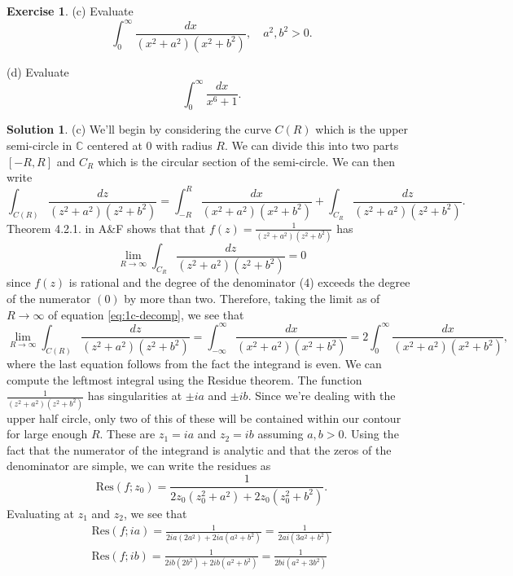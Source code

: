 \documentclass[12pt]{article}
\newcommand{\bbC}{\mathbb{C}}
\newcommand{\Res}{\text{Res}}
\theoremstyle{definition}
\newtheorem{exer}{Exercise}
\newtheorem{sol}{Solution}
\theoremstyle{remark}
\begin{document}
\begin{exer}
    \leavevmode
    
    (c) Evaluate 
    \begin{equation*}
        \int_0^\infty \frac{dx}{(x^2+a^2)(x^2+b^2)}, \quad a^2, b^2 > 0.
    \end{equation*}

    (d) Evaluate
    \begin{equation*}
        \int_0^\infty \frac{dx}{x^6+1}. 
    \end{equation*}
\end{exer}
\begin{sol}
    \leavevmode
    
    (c) We'll begin by considering the curve $C(R)$ which is the upper semi-circle in $\bbC$ centered at 0 with radius $R$. We can divide this into two parts $[-R,R]$ and $C_R$ which is the circular section of the semi-circle. We can then write
    \begin{equation}
    \label{eq:1c-decomp}
        \int_{C(R)}  \frac{dz}{(z^2+a^2)(z^2+b^2)} =   \int_{-R}^{R} \frac{dx}{(x^2+a^2)(x^2+b^2)} +   \int_{C_R}  \frac{dz}{(z^2+a^2)(z^2+b^2)}.
    \end{equation}
    Theorem 4.2.1. in A\&F shows that that $f(z) = \frac{1}{(z^2+a^2)(z^2+b^2)}$ has 
    \begin{equation*}
        \lim\limits_{R\to\infty}  \int_{C_R}  \frac{dz}{(z^2+a^2)(z^2+b^2)} = 0
    \end{equation*}
    since $f(z)$ is rational and the degree of the denominator (4) exceeds the degree of the numerator $(0)$ by more than two. Therefore, taking the limit as of $R\to\infty$ of equation \cref{eq:1c-decomp}, we see that
    \begin{equation}
        \lim\limits_{R\to\infty}  \int_{C(R)}  \frac{dz}{(z^2+a^2)(z^2+b^2)} =  \int_{-\infty}^{\infty} \frac{dx}{(x^2+a^2)(x^2+b^2)} = 2 \int_{0}^\infty \frac{dx}{(x^2+a^2)(x^2+b^2)},
    \end{equation}
    where the last equation follows from the fact the integrand is even. We can compute the leftmost integral using the Residue theorem. The function $\frac{1}{(z^2+a^2)(z^2+b^2)}$ has singularities at $\pm ia$ and $\pm ib$. Since we're dealing with the upper half circle, only two of this of these will be contained within our contour for large enough $R$. These are $z_1 = ia$ and $z_2 = ib$ assuming $a,b>0$. Using the fact that the numerator of the integrand is analytic and that the zeros of the denominator are simple, we can write the residues as
    \begin{equation}
        \Res(f;z_0) = \frac{1}{2z_0(z_0^2 + a^2)  +2z_0 (z_0^2 + b^2)}.
    \end{equation}
Evaluating at $z_1$ and $z_2$, we see that
\begin{align}
    \Res(f; ia) = \frac{1}{2ia(2a^2) + 2ia (a^2 + b^2) } = \frac{1}{2ai(3a^2 + b^2)}\\
    \Res(f; ib) = \frac{1}{2ib(2b^2) + 2ib (a^2 + b^2) } = \frac{1}{2bi(a^2 +3b^2)}
\end{align}


\end{sol}
\end{document}
